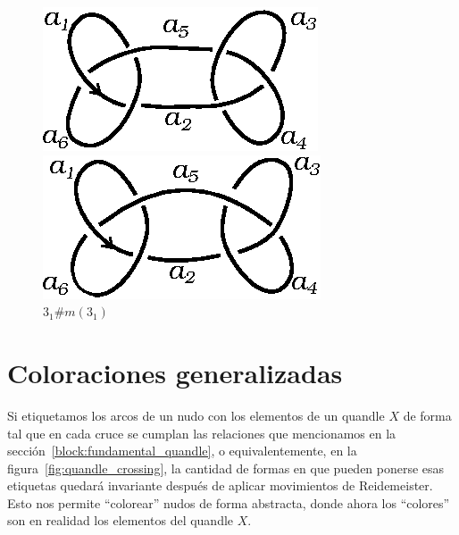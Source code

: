 \documentclass[graybox]{svmult}
\begin{document}
	\begin{figure}[ht]
		\centering
        \begin{minipage}{0.4\textwidth}
            \centering
			\includegraphics[scale=0.6]{images/granny}
			\caption{$3_1\#3_1$}
			\label{fig:granny}
		\end{minipage}
		\begin{minipage}{0.4\textwidth}
			\centering
			\includegraphics[scale=0.6]{images/square}
			\caption{$3_1\#m(3_1)$}
			\label{fig:square}
		\end{minipage}
    \end{figure}


 
\section{Coloraciones generalizadas}
\label{section:coloreos_generalizados}

    \label{block:counting_invariant}
    Si etiquetamos los arcos de un nudo con los elementos de un quandle $X$ de
    forma tal que en cada cruce se cumplan las relaciones que mencionamos
    en la sección~\ref{block:fundamental_quandle}, o equivalentemente, en la
    figura~\ref{fig:quandle_crossing}, la cantidad de formas en que pueden
    ponerse esas etiquetas quedará invariante después de aplicar movimientos de
    Reidemeister. Esto nos permite ``colorear'' nudos de forma abstracta, donde
    ahora los ``colores'' son en realidad los elementos del quandle $X$. 
\end{document}
